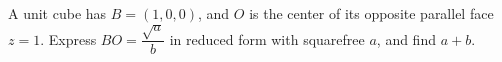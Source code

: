 A unit cube has $B=(1,0,0)$, and $O$ is the center of its opposite parallel face $z=1$. Express $BO=\dfrac{\sqrt a}{b}$ in reduced form with squarefree $a$, and find $a+b$.
